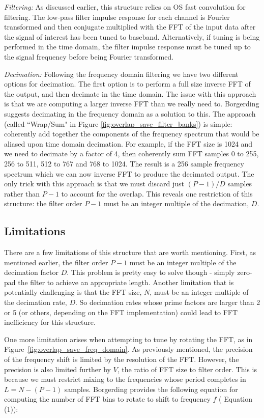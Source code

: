 \documentclass[12pt]{article}
\begin{document}
\emph{Filtering:} As discussed earlier, this structure relies on OS fast
convolution for filtering. The low-pass filter impulse response for each
channel is Fourier transformed and then conjugate multiplied with the FFT of
the input data after the signal of interest has been tuned to baseband.
Alternatively, if tuning is being performed in the time domain, the filter
impulse response must be tuned up to the signal frequency before being Fourier
transformed.

\emph{Decimation:} Following the frequency domain filtering we have two
different options for decimation. The first option is to perform a full size
inverse FFT of the output, and then decimate in the time domain. The issue with
this approach is that we are computing a larger inverse FFT than we really need
to. Borgerding suggests decimating in the frequency domain as a solution to this.
The approach (called ``Wrap/Sum" in Figure
\ref{fig:overlap_save_filter_banks}) is simple: coherently add together the
components of the frequency spectrum that would be aliased upon time domain
decimation. For example, if the FFT size is 1024 and we need to decimate by
a factor of 4, then coherently sum FFT samples 0 to 255, 256 to 511, 512 to 
767 and 768 to 1024.  The result is a 256 sample frequency
spectrum which we can now inverse FFT to produce the decimated output. The
only trick with this approach is that we must discard just $(P-1)/D$
samples rather than $P-1$ to account for the overlap.  This reveals one
restriction of this structure: the filter order $P-1$ must be an integer
multiple of the decimation, $D$.

\subsection{Limitations}
\label{sec:os_limitations}
There are a few limitations of this structure that are worth mentioning. First,
as mentioned earlier, the filter order $P-1$ must be an integer multiple of the
decimation factor $D$. This problem is pretty easy to solve though - simply
zero-pad the filter to achieve an appropriate length. Another limitation that
is potentially challenging is that the FFT size, $N$, must be an integer
multiple of the decimation rate, $D$. So decimation rates whose prime factors
are larger than 2 or 5 (or others, depending on the FFT implementation) could
lead to FFT inefficiency for this structure.

One more limitation arises when attempting to tune by rotating the FFT, as in
Figure~\ref{fig:overlap_save_freq_domain}.  As previously mentioned, the
precision of the frequency shift is limited by the resolution of the FFT.
However, the precision is also limited further by $V$, the ratio of FFT size to
filter order. This is because we must restrict mixing to the frequencies whose
period completes in $L=N-(P-1)$ samples. Borgerding provides the following
equation for computing the number of FFT bins to rotate to shift to frequency
$f$ (\cite{Borgerding1} Equation (1)):
\end{document}
